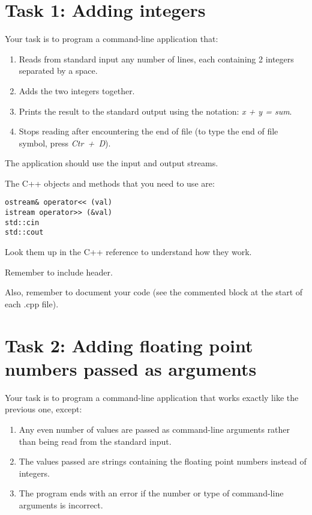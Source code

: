 \section*{Task 1: Adding integers}

Your task is to program a command-line application that:
\begin{enumerate}
  \item Reads from standard input any number of lines, each containing 2 integers separated by a space.
  \item Adds the two integers together.
  \item Prints the result to the standard output using the notation: \emph{x + y = sum}.
  \item Stops reading after encountering the end of file (to type the end of file symbol, press \emph{Ctr~+~D}).
\end{enumerate}
The application should use the input and output streams. 

The C++ objects and methods that you need to use are:
\begin{verbatim}
ostream& operator<< (val)
istream operator>> (&val)
std::cin
std::cout
\end{verbatim}

Look them up in the C++ reference to understand how they work. 

Remember to include  header. 

Also, remember to document your code (see the commented block at the start of each .cpp file). 


\section*{Task 2: Adding floating point numbers passed as arguments}

Your task is to program a command-line application that works exactly like the previous one, except:
\begin{enumerate}
	\item Any even number of values are passed as command-line arguments rather than being read from the standard input.
	\item The values passed are strings containing the floating point numbers instead of integers.
	\item The program ends with an error if the number or type of command-line arguments is incorrect.
\end{enumerate}

